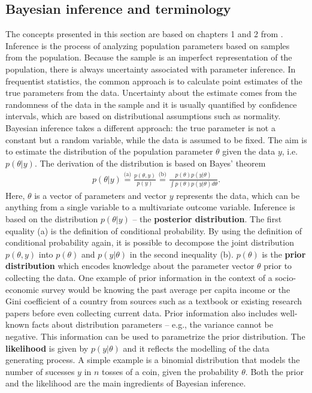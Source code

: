 \subsection{Bayesian inference and terminology}

The concepts presented in this section are based on chapters 1 and 2 from \cite{gelman_bayesian_2014}.
Inference is the process of analyzing population parameters based on samples from the population.
Because the sample is an imperfect representation of the population, there is always uncertainty associated with parameter inference.
In frequentist statistics, the common approach is to calculate point estimates of the true parameters from the data.
Uncertainty about the estimate comes from the randomness of the data in the sample and it is usually quantified by confidence intervals, which are based on distributional assumptions such as normality.
Bayesian inference takes a different approach: the true parameter is not a constant but a random variable, while the data is assumed to be fixed.
The aim is to estimate the distribution of the population parameter $\theta$ given the data $y$, i.e. $p(\theta|y)$.
The derivation of the distribution is based on Bayes' theorem
\begin{gather*}
	\displaystyle p(\theta | y) \overset {\text{(a)}}{=}  \frac {p(\theta, y)}{p(y)} \overset {\text{(b)}}{=} \frac {p(\theta) p(y|\theta)}{\int p(\theta) p(y|\theta)d\theta}.
\end{gather*}
Here, $\theta$ is a vector of parameters and vector $y$ represents the data, which can be anything from a single variable to a multivariate outcome variable.
Inference is based on the distribution $p(\theta | y )$ – the \textbf{posterior distribution}.
The first equality (a) is the definition of conditional probability.
By using the definition of conditional probability again, it is possible to decompose the joint distribution $p(\theta, y)$ into $p(\theta)$ and $p(y|\theta)$ in the second inequality (b).
$p(\theta)$ is the \textbf{prior distribution} which encodes knowledge about the parameter vector $\theta$ prior to collecting the data.
One example of prior information in the context of a socio-economic survey would be knowing the past average per capita income or the Gini coefficient of a country from sources such as a textbook or existing research papers before even collecting current data.
Prior information also includes well-known facts about distribution parameters – e.g., the variance cannot be negative.
This information can be used to parametrize the prior distribution.
The \textbf{likelihood} is given by $p(y | \theta)$ and it reflects the modelling of the data generating process.
A simple example is a binomial distribution that models the number of sucesses $y$ in $n$ tosses of a coin, given the probability $\theta$.
Both the prior and the likelihood are the main ingredients of Bayesian inference.

